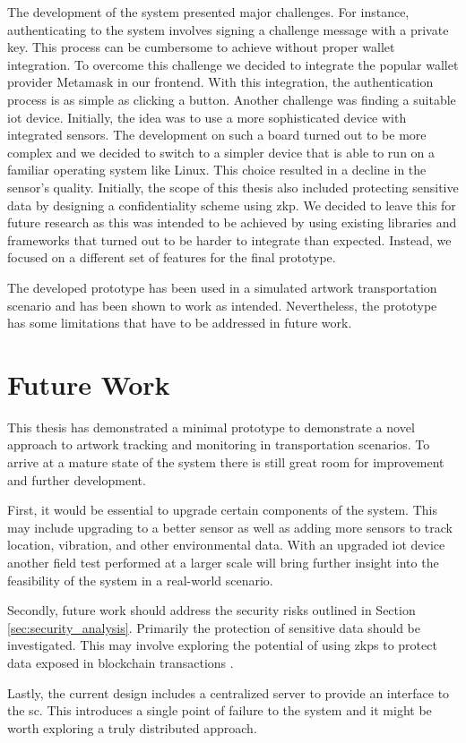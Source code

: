 The development of the system presented major challenges. For instance, authenticating to the system involves signing a challenge message with a private key. This process can be cumbersome to achieve without proper wallet integration. To overcome this challenge we decided to integrate the popular wallet provider Metamask in our frontend. With this integration, the authentication process is as simple as clicking a button. Another challenge was finding a suitable \gls{iot} device. Initially, the idea was to use a more sophisticated device with integrated sensors. The development on such a board turned out to be more complex and we decided to switch to a simpler device that is able to run on a familiar operating system like Linux. This choice resulted in a decline in the sensor's quality. Initially, the scope of this thesis also included protecting sensitive data by designing a confidentiality scheme using \gls{zkp}. We decided to leave this for future research as this was intended to be achieved by using existing libraries and frameworks that turned out to be harder to integrate than expected. Instead, we focused on a different set of features for the final prototype.

The developed prototype has been used in a simulated artwork transportation scenario and has been shown to work as intended. Nevertheless, the prototype has some limitations that have to be addressed in future work.

\section{Future Work}
This thesis has demonstrated a minimal prototype to demonstrate a novel approach to artwork tracking and monitoring in transportation scenarios. To arrive at a mature state of the system there is still great room for improvement and further development.

First, it would be essential to upgrade certain components of the system. This may include upgrading to a better sensor as well as adding more sensors to track location, vibration, and other environmental data. With an upgraded \gls{iot} device another field test performed at a larger scale will bring further insight into the feasibility of the system in a real-world scenario.

Secondly, future work should address the security risks outlined in Section \ref{sec:security_analysis}. Primarily the protection of sensitive data should be investigated. This may involve exploring the potential of using \glspl{zkp} to protect data exposed in blockchain transactions \cite{zkdet}.

Lastly, the current design includes a centralized server to provide an interface to the \gls{sc}. This introduces a single point of failure to the system and it might be worth exploring a truly distributed approach. 
